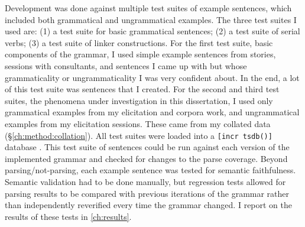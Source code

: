
Development was done against multiple test suites of example sentences, which included both grammatical and ungrammatical examples. The three test suites I used are: (1) a test suite for basic grammatical sentences; (2) a test suite of serial verbs; (3) a test suite of linker constructions. For the first test suite, basic components of the grammar, I used simple example sentences from stories, sessions with consultants, and sentences I came up with but whose grammaticality or ungrammaticality I was very confident about. In the end, a lot of this test suite was sentences that I created. For the second and third test suites, the phenomena under investigation in this dissertation, I used only grammatical examples from my elicitation and corpora work, and ungrammatical examples from my elicitation sessions. These came from my collated data (\S\ref{ch:method:collation}).  All test suites were loaded into a \texttt{[incr tsdb()]} database \citep{oepen2001}. This test suite of sentences could be run against each version of the implemented grammar and checked for changes to the parse coverage. Beyond parsing/not-parsing, each example sentence was tested for semantic faithfulness. Semantic validation had to be done manually, but regression tests allowed for parsing results to be compared with previous iterations of the grammar rather than independently reverified every time the grammar changed. I report on the results of these tests in \cref{ch:results}.

